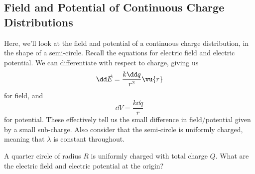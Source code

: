 \documentclass[11pt]{article}
\begin{document}
\subsection{Field and Potential of Continuous Charge Distributions}
Here, we'll look at the field and potential of a continuous charge distribution, in the shape of a semi-circle. Recall the equations for electric field and electric potential. We can differentiate with respect to charge, giving us
\begin{equation}
    \dd \vec{E} = \frac{k\dd q}{r^2} \vu{r}
\end{equation}
for field, and
\begin{equation}
    \dd V = \frac{k\dd q}{r}
\end{equation}
for potential. These effectively tell us the small difference in field/potential given by a small sub-charge. Also consider that the semi-circle is uniformly charged, meaning that $\lambda$ is constant throughout.
\begin{example}
    A quarter circle of radius $R$ is uniformly charged with total charge $Q$. What are the electric field and electric potential at the origin?
\end{example}
\end{document}
